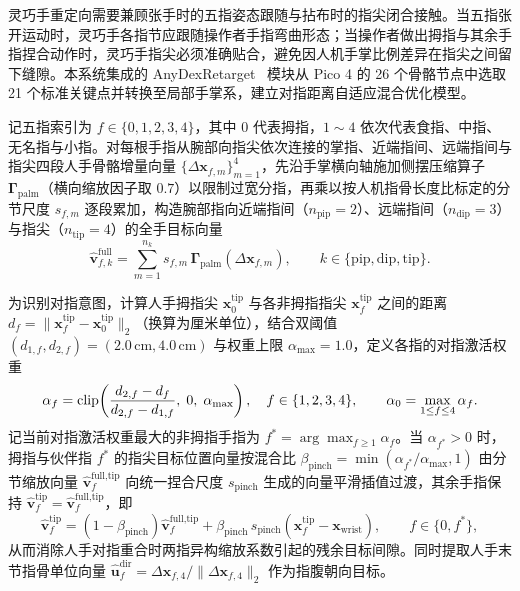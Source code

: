 灵巧手重定向需要兼顾张手时的五指姿态跟随与拈布时的指尖闭合接触。当五指张开运动时，灵巧手各指节应跟随操作者手指弯曲形态；当操作者做出拇指与其余手指捏合动作时，灵巧手指尖必须准确贴合，避免因人机手掌比例差异在指尖之间留下缝隙。本系统集成的 AnyDexRetarget~\cite{qiu2025anydexretarget} 模块从 Pico 4 的 26 个骨骼节点中选取 21 个标准关键点并转换至局部手掌系，建立对指距离自适应混合优化模型。

记五指索引为 $f \in \{0, 1, 2, 3, 4\}$，其中 $0$ 代表拇指，$1\sim 4$ 依次代表食指、中指、无名指与小指。对每根手指从腕部向指尖依次连接的掌指、近端指间、远端指间与指尖四段人手骨骼增量向量 $\{\Delta\bm{x}_{f,m}\}_{m=1}^4$，先沿手掌横向轴施加侧摆压缩算子 $\bm{\Gamma}_{\text{palm}}$（横向缩放因子取 $0.7$）以限制过宽分指，再乘以按人机指骨长度比标定的分节尺度 $s_{f,m}$ 逐段累加，构造腕部指向近端指间（$n_{\text{pip}}=2$）、远端指间（$n_{\text{dip}}=3$）与指尖（$n_{\text{tip}}=4$）的全手目标向量
\begin{equation}
  \hat{\bm{v}}_{f,k}^{\text{full}} = \sum_{m=1}^{n_k} s_{f,m}\,\bm{\Gamma}_{\text{palm}}\!\left(\Delta\bm{x}_{f,m}\right), \qquad k \in \{\text{pip}, \text{dip}, \text{tip}\}.
  \label{eq:segment-bone-scaling}
\end{equation}

为识别对指意图，计算人手拇指尖 $\bm{x}_0^{\text{tip}}$ 与各非拇指指尖 $\bm{x}_f^{\text{tip}}$ 之间的距离 $d_f = \|\bm{x}_f^{\text{tip}} - \bm{x}_0^{\text{tip}}\|_2$（换算为厘米单位），结合双阈值 $(d_{1,f}, d_{2,f}) = (2.0\,\mathrm{cm}, 4.0\,\mathrm{cm})$ 与权重上限 $\alpha_{\max} = 1.0$，定义各指的对指激活权重
\begin{equation}
  \alpha_f = \operatorname{clip}\!\left(\frac{d_{2,f} - d_f}{d_{2,f} - d_{1,f}}, \; 0, \; \alpha_{\max}\right), \quad f \in \{1,2,3,4\}, \qquad
  \alpha_0 = \max_{1 \le f \le 4} \alpha_f.
  \label{eq:pinch-alpha}
\end{equation}
记当前对指激活权重最大的非拇指手指为 $f^* = \arg\max_{f \ge 1} \alpha_f$。当 $\alpha_{f^*} > 0$ 时，拇指与伙伴指 $f^*$ 的指尖目标位置向量按混合比 $\beta_{\text{pinch}} = \min(\alpha_{f^*}/\alpha_{\max}, 1)$ 由分节缩放向量 $\hat{\bm{v}}_f^{\text{full,tip}}$ 向统一捏合尺度 $s_{\text{pinch}}$ 生成的向量平滑插值过渡，其余手指保持 $\hat{\bm{v}}_f^{\text{tip}} = \hat{\bm{v}}_f^{\text{full,tip}}$，即
\begin{equation}
  \hat{\bm{v}}_f^{\text{tip}} = (1 - \beta_{\text{pinch}})\hat{\bm{v}}_f^{\text{full,tip}} + \beta_{\text{pinch}}\, s_{\text{pinch}}\!\left(\bm{x}_f^{\text{tip}} - \bm{x}_{\text{wrist}}\right), \qquad f \in \{0, f^*\},
  \label{eq:pinch-tip-blend}
\end{equation}
从而消除人手对指重合时两指异构缩放系数引起的残余目标间隙。同时提取人手末节指骨单位向量 $\hat{\bm{u}}_f^{\text{dir}} = \Delta\bm{x}_{f,4} / \|\Delta\bm{x}_{f,4}\|_2$ 作为指腹朝向目标。

